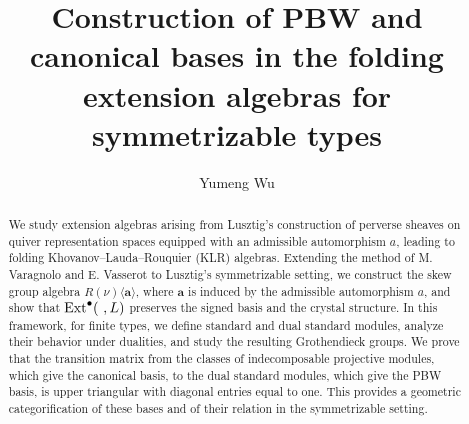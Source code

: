 \documentclass[10pt]{amsart}
\def\Ext{\mbox{\rm Ext}}   \def\Ker{\mbox{\rm Ker}\,}
\begin{document}
\title[]{Construction of PBW and canonical bases in the folding extension algebras for symmetrizable types}


\author{Yumeng Wu}

\address{Beijing International Center for Mathematical Research, Beijing 100871, P. R. China}





\keywords{}



\begin{abstract}
We study extension algebras arising from Lusztig's construction of perverse sheaves on quiver representation spaces equipped with an admissible automorphism $a$, leading to folding Khovanov--Lauda--Rouquier (KLR) algebras. Extending the method of M. Varagnolo and E. Vasserot to Lusztig's symmetrizable setting, we construct the skew group algebra $R(\nu)\langle\mathbf{a}\rangle$, where $\mathbf{a}$ is induced by the admissible automorphism $a$, and show that $\Ext^{\bullet}(\ ,L)$ preserves the signed basis and the crystal structure. In this framework, for finite types, we define standard and dual standard modules, analyze their behavior under dualities, and study the resulting Grothendieck groups. We prove that the transition matrix from the classes of indecomposable projective modules, which give the canonical basis, to the dual standard modules, which give the PBW basis, is upper triangular with diagonal entries equal to one. This provides a geometric categorification of these bases and of their relation in the symmetrizable setting.
\end{abstract}

\maketitle
\end{document}
